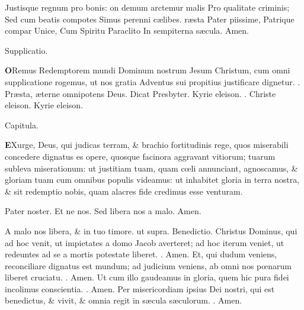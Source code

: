 \documentclass[letter,11pt]{book}
\makeatletter
\DeclareRobustCommand{\Rbar}{\vers@resp{0pt}{R}}
\newcommand{\vers@resp@sym}{\raisebox{0.2ex}{\rotatebox[origin=c]{-20}{$\m@th\rceil$}}}
\newcommand{\vers@resp}[2]{%
  {\ooalign{\hidewidth\kern#1\vers@resp@sym\hidewidth\cr#2\cr}}%
}%
\def\R{\color{Red} \Rbar . \color{black}}
\makeatother
\begin{document}
\begin{multicols}{2}
\newline \indent Justisque regnum pro bonis:
on demum arctemur malis
\newline \indent Pro qualitate criminis;
\newline \indent Sed cum beatis compotes
\newline \indent Simus perenni c\ae libes.
r\ae sta Pater piissime,
\newline \indent Patrique compar Unice,
\newline \indent Cum Spiritu Paraclito
\newline \indent In sempiterna s\ae cula. Amen.
\vspace{-.75em} \begin{center} \color{Red} Supplicatio. \end{center} \vspace{-.75em}
\lettrine[lines=2]{\bfseries \color{Red} O}{}Remus Redemptorem mundi Dominum nostrum Jesum Christum, cum omni supplicatione rogemus, ut nos gratia Adventus sui propitius justificare dignetur. \R Pr\ae sta, \ae terne omnipotens Deus.
\newline \color{Red} Dicat Presbyter. \color{black} Kyrie eleison. \R Christe eleison. Kyrie eleison.
\vspace{-.75em} \begin{center} \color{Red} Capitula. \end{center} \vspace{-.75em}
\lettrine[lines=2]{\bfseries \color{Red} E}{}Xurge, Deus, qui judicas terram, \& brachio fortitudinis rege, quos miserabili concedere dignatus es opere, quosque facinora aggravant vitiorum; tuarum subleva miserationum: ut justitiam tuam, quam c\oe li annunciant, agnoscamus, \& gloriam tuam cum omnibus populis videamus: ut inhabitet gloria in terra nostra, \& sit redemptio nobis, quam alacres fide credimus esse venturam.
\par Pater noster. Et ne nos. Sed libera nos a malo. Amen.
\par A malo nos libera, \& in tuo timore. \color{Red} ut supra. Benedictio. \color{black} Christus Dominus, qui ad hoc venit, ut impietates a domo Jacob averteret; ad hoc iterum veniet, ut redeuntes ad se a mortis potestate liberet. \R Amen. Et, qui dudum veniens, reconciliare dignatus est mundum; ad judicium veniens, ab omni nos p\oe narum liberet cruciatu. \R Amen. Ut cum illo gaudeamus in gloria, quem hic pura fidei incolimus conscientia. \R Amen. Per misericordiam ipsius Dei nostri, qui est benedictus, \& vivit, \& omnia regit in s\ae cula s\ae culorum. \R Amen.

\end{multicols}
\end{document}
